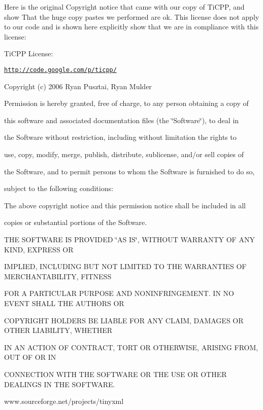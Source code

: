 Here is the original Copyright notice that came with our copy of TiCPP, and show That the huge copy pastes we performed are ok. This license does not apply to our code and is shown here explicitly show that we are in compliance with this license: \par
 \par
 TiCPP License: \par
 \par
 \href{http://code.google.com/p/ticpp/}{\tt http://code.google.com/p/ticpp/} \par
 Copyright (c) 2006 Ryan Pusztai, Ryan Mulder \par
 \par
 Permission is hereby granted, free of charge, to any person obtaining a copy of \par
 this software and associated documentation files (the \char`\"{}Software\char`\"{}), to deal in \par
 the Software without restriction, including without limitation the rights to \par
 use, copy, modify, merge, publish, distribute, sublicense, and/or sell copies of \par
 the Software, and to permit persons to whom the Software is furnished to do so, \par
 subject to the following conditions: \par
 \par
 The above copyright notice and this permission notice shall be included in all \par
 copies or substantial portions of the Software. \par
 \par
 THE SOFTWARE IS PROVIDED \char`\"{}AS IS\char`\"{}, WITHOUT WARRANTY OF ANY KIND, EXPRESS OR \par
 IMPLIED, INCLUDING BUT NOT LIMITED TO THE WARRANTIES OF MERCHANTABILITY, FITNESS \par
 FOR A PARTICULAR PURPOSE AND NONINFRINGEMENT. IN NO EVENT SHALL THE AUTHORS OR \par
 COPYRIGHT HOLDERS BE LIABLE FOR ANY CLAIM, DAMAGES OR OTHER LIABILITY, WHETHER \par
 IN AN ACTION OF CONTRACT, TORT OR OTHERWISE, ARISING FROM, OUT OF OR IN \par
 CONNECTION WITH THE SOFTWARE OR THE USE OR OTHER DEALINGS IN THE SOFTWARE. \par
\par
 www.sourceforge.net/projects/tinyxml \par

